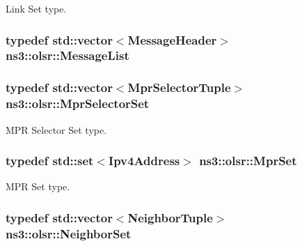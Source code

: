Link Set type. 

\subsubsection[{\texorpdfstring{Message\+List}{MessageList}}]{\setlength{\rightskip}{0pt plus 5cm}typedef std\+::vector$<${\bf Message\+Header}$>$ {\bf ns3\+::olsr\+::\+Message\+List}}\hypertarget{namespacens3_1_1olsr_af17c710718a5637d01f37804a0a53e78}{}\label{namespacens3_1_1olsr_af17c710718a5637d01f37804a0a53e78}
\subsubsection[{\texorpdfstring{Mpr\+Selector\+Set}{MprSelectorSet}}]{\setlength{\rightskip}{0pt plus 5cm}typedef std\+::vector$<${\bf Mpr\+Selector\+Tuple}$>$ {\bf ns3\+::olsr\+::\+Mpr\+Selector\+Set}}\hypertarget{namespacens3_1_1olsr_a320f5a705b7edfac35236d3e28e10e59}{}\label{namespacens3_1_1olsr_a320f5a705b7edfac35236d3e28e10e59}


M\+PR Selector Set type. 

\subsubsection[{\texorpdfstring{Mpr\+Set}{MprSet}}]{\setlength{\rightskip}{0pt plus 5cm}typedef std\+::set$<${\bf Ipv4\+Address}$>$ {\bf ns3\+::olsr\+::\+Mpr\+Set}}\hypertarget{namespacens3_1_1olsr_aa7c4ede0ba85f0ea9da6e6699525bd4a}{}\label{namespacens3_1_1olsr_aa7c4ede0ba85f0ea9da6e6699525bd4a}


M\+PR Set type. 

\subsubsection[{\texorpdfstring{Neighbor\+Set}{NeighborSet}}]{\setlength{\rightskip}{0pt plus 5cm}typedef std\+::vector$<${\bf Neighbor\+Tuple}$>$ {\bf ns3\+::olsr\+::\+Neighbor\+Set}}\hypertarget{namespacens3_1_1olsr_af0afef1f28c6f0a0b528b03b638df05d}{}\label{namespacens3_1_1olsr_af0afef1f28c6f0a0b528b03b638df05d}


